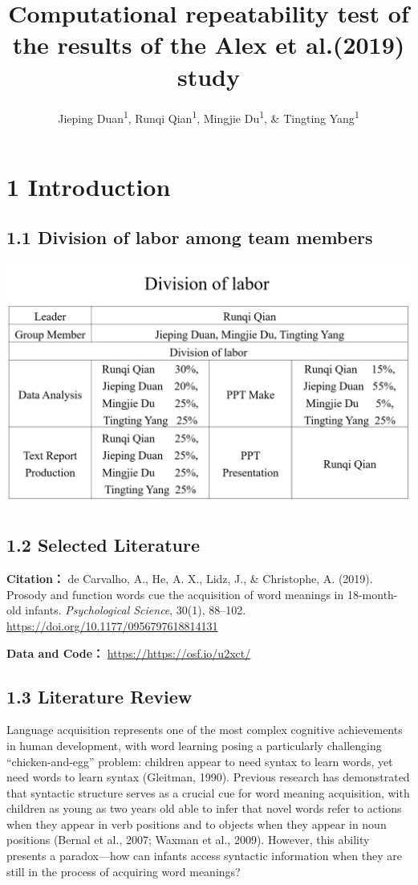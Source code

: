 \documentclass[
  man]{apa6}
\title{Computational repeatability test of the results of the Alex et al.(2019) study}
\author{Jieping Duan\textsuperscript{1}, Runqi Qian\textsuperscript{1}, Mingjie Du\textsuperscript{1}, \& Tingting Yang\textsuperscript{1}}
\date{}
\affiliation{\vspace{0.5cm}\textsuperscript{1} Nanjing Normal University}
\begin{document}
\maketitle

\section{1 Introduction}\label{introduction}

\subsection{1.1 Division of labor among team members}\label{division-of-labor-among-team-members}

\includegraphics{pic/division_of_labor.png}

\subsection{1.2 Selected Literature}\label{selected-literature}

\textbf{Citation：} de Carvalho, A., He, A. X., Lidz, J., \& Christophe, A. (2019). Prosody and function words cue the acquisition of word meanings in 18-month-old infants. \emph{Psychological Science}, 30(1), 88--102. \url{https://doi.org/10.1177/0956797618814131}

\textbf{Data and Code：} \url{https://https://osf.io/u2xct/}

\subsection{1.3 Literature Review}\label{literature-review}

Language acquisition represents one of the most complex cognitive achievements in human development, with word learning posing a particularly challenging ``chicken-and-egg'' problem: children appear to need syntax to learn words, yet need words to learn syntax (Gleitman, 1990). Previous research has demonstrated that syntactic structure serves as a crucial cue for word meaning acquisition, with children as young as two years old able to infer that novel words refer to actions when they appear in verb positions and to objects when they appear in noun positions (Bernal et al., 2007; Waxman et al., 2009). However, this ability presents a paradox---how can infants access syntactic information when they are still in the process of acquiring word meanings?
\end{document}
